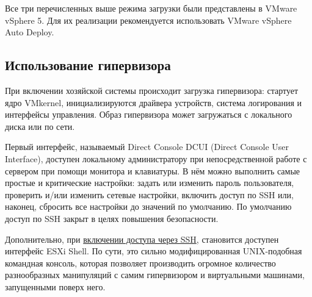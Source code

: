 \documentclass[14pt, a4paper]{article}
\begin{document}
Все три перечисленных выше режима загрузки были представлены в VMware vSphere 5. Для их
реализации рекомендуется использовать VMware vSphere Auto Deploy.

\subsection*{Использование гипервизора}

При включении хозяйской системы происходит загрузка гипервизора: стартует ядро VMkernel,
инициализируются драйвера устройств, система логирования и интерфейсы управления. Образ
гипервизора может загружаться с локального диска или по сети.

Первый интерфейс, называемый Direct Console DCUI (Direct Console User Interface), доступен
локальному администратору при непосредственной работе с сервером при помощи монитора и
клавиатуры. В нём можно выполнить самые простые и критические настройки: задать или изменить
пароль пользователя, проверить и/или изменить сетевые настройки, включить доступ по SSH или,
наконец, сбросить все настройки до значений по умолчанию. По умолчанию доступ по SSH закрыт в
целях повышения безопасности.

\begin{figure}[h]%
    \centering
    \label{framework} %
\end{figure}

Дополнительно, при \href{https://vmblog.ru/kak-vklyuchit-ssh-v-vmware-esxi-6-x/}{включении доступа через SSH}, становится доступен интерфейс ESXi Shell. По
сути, это сильно модифицированная UNIX-подобная командная консоль, которая позволяет
производить огромное количество разнообразных манипуляций с самим гипервизором и
виртуальными машинами, запущенными поверх него.
\end{document}
